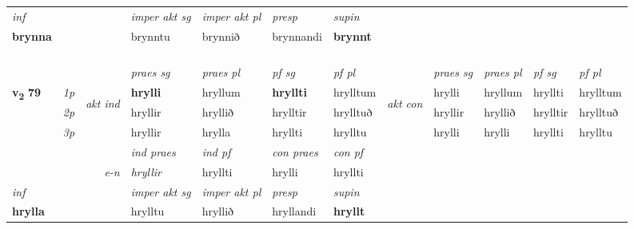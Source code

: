 \begin{longtable}[l]{X>{\footnotesize\itshape}llXXXXlXXXX}
   {\textit{inf}} & &  & \textit{imper akt sg} & \textit{imper akt pl}   & \textit{presp} & \textit{supin}   \\*
  {\textbf{brynna}} & && brynntu  & brynnið   & brynnandi &  \textbf{brynnt}   \\*

\midrule
 & \\*
  & \\*
   & \\*
  & \\
   \midrule
 & &   & \textit{praes sg}  & \textit{praes pl}    & \textit{ pf sg} & \textit{pf pl} & & \textit{praes sg}  & \textit{praes pl}    & \textit{pf sg} & \textit{pf pl }  \\ \cmidrule{4-7} \cmidrule{9-12}
 \multirow{2}{*}{{{\textbf{v{\textsubscript{2}}} \Large{\textbf{79}}}}}  & 1p & \multirow{3}{*}{\begin{turn}{90}\textit{akt ind}\end{turn}} & \textbf{hrylli} & hryllum & \textbf{hryllti} & hrylltum & \multirow{3}{*}{\begin{turn}{90}\textit{akt con}\end{turn}} &hrylli & hryllum & hryllti & hrylltum\\*
 & 2p &  &  hryllir  & hryllið & hrylltir & hrylltuð & & hryllir & hryllið & hrylltir & hrylltuð \\*
 & 3p &  & hryllir & hrylla & hryllti & hrylltu & & hrylli & hrylli& hryllti & hrylltu \\*
\cmidrule{4-7} \cmidrule{9-12}

   && &  \textit{ind praes} & \textit{ind pf} & \textit{con praes} & \textit{con pf} \\*
\multicolumn{3}{r}{\textit{e-n}} & hryllir & hryllti & hrylli & hryllti \\*

\cmidrule{4-7}
   {\textit{inf}} & &  & \textit{imper akt sg} & \textit{imper akt pl}   & \textit{presp} & \textit{supin}   \\*
  {\textbf{hrylla}} & && hrylltu  & hryllið   & hryllandi &  \textbf{hryllt}   \\*

\midrule


\end{longtable}
